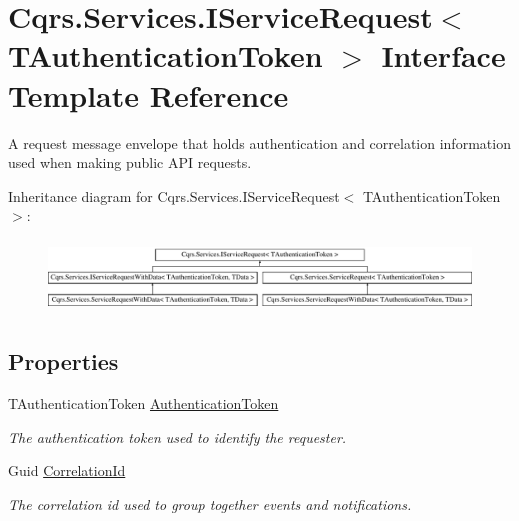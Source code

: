 \hypertarget{interfaceCqrs_1_1Services_1_1IServiceRequest}{}\section{Cqrs.\+Services.\+I\+Service\+Request$<$ T\+Authentication\+Token $>$ Interface Template Reference}
\label{interfaceCqrs_1_1Services_1_1IServiceRequest}


A request message envelope that holds authentication and correlation information used when making public A\+PI requests.  


Inheritance diagram for Cqrs.\+Services.\+I\+Service\+Request$<$ T\+Authentication\+Token $>$\+:\begin{figure}[H]
\begin{center}
\leavevmode
\includegraphics[height=1.944444cm]{interfaceCqrs_1_1Services_1_1IServiceRequest}
\end{center}
\end{figure}
\subsection*{Properties}
\begin{DoxyCompactItemize}
\item 
T\+Authentication\+Token \hyperlink{interfaceCqrs_1_1Services_1_1IServiceRequest_a43350104fd645d2d9b4359716c23fdb4}{Authentication\+Token}
\begin{DoxyCompactList}\small\item\em The authentication token used to identify the requester. \end{DoxyCompactList}\item 
Guid \hyperlink{interfaceCqrs_1_1Services_1_1IServiceRequest_aea1c494a4852fc72d8883fd70bf1aeb9}{Correlation\+Id}
\begin{DoxyCompactList}\small\item\em The correlation id used to group together events and notifications. \end{DoxyCompactList}\end{DoxyCompactItemize}


